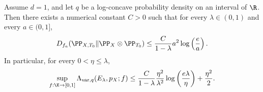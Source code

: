 \begin{theorem}
    \label{theorem:log_concave_log_factor}
    Assume $d=1$, and let $q$ be a log-concave probability density on an interval of $\R$.
    Then there exists a numerical constant $C>0$ such that for every
    $\lambda\in(0,1)$ and every $a\in(0,1]$,
    \begin{align}
        D_{f_a}(\PP_{X,T_0}\|\PP_X\otimes\PP_{T_0})
        \le
        \frac{C}{1-\lambda}
        a^2 \log\left(\frac{e}{a}\right).
        \label{eq:log_concave_log_factor_fa_upper}
    \end{align}
    In particular, for every $0<\eta\le \lambda$,
    \begin{align}
        \sup_{f:\K\to[0,1]}
        \Lambda_{\mathrm{var},q}(E_\lambda,p_X;f)
        \le
        \frac{C}{1-\lambda}
        \frac{\eta^2}{\lambda^2}
        \log\left(\frac{e\lambda}{\eta}\right)
        +
        \frac{\eta^2}{2}.
        \label{eq:log_concave_log_factor_variance_upper}
    \end{align}
\end{theorem}

